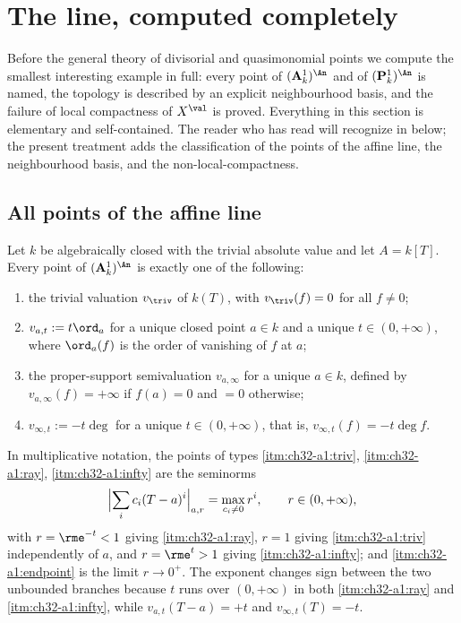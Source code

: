 \section{The line, computed completely}
\label{sec:ch32-line}

Before the general theory of divisorial and quasimonomial points we compute
the smallest interesting example in full: every point of
$(\mathbf A^1_k)^{\An}$ and of $(\mathbf P^1_k)^{\An}$ is named, the
topology is described by an explicit neighbourhood basis, and the failure of
local compactness of $X^{\val}$ is proved.  Everything in this section is
elementary and self-contained.  The reader who has read
 will recognize
 in  below; the
present treatment adds the classification of the points of the affine line,
the neighbourhood basis, and the non-local-compactness.

\subsection{All points of the affine line}
\label{sec:ch32-affine-line}

\begin{theorem}
\label{thm:ch32-a1-classification}
Let $k$ be algebraically closed with the trivial absolute value and let
$A=k[T]$.  Every point of $(\mathbf A^1_k)^{\An}$ is exactly one of the
following:
\begin{enumerate}
\item\label{itm:ch32-a1:triv}
the trivial valuation $v_{\triv}$ of $k(T)$, with
$v_\triv(f)=0$ for all $f\neq0$;
\item\label{itm:ch32-a1:ray}
$v_{a,t}:=t\ord_a$ for a unique closed point $a\in k$ and a unique
$t\in(0,+\infty)$, where $\ord_a(f)$ is the order of vanishing of $f$
at $a$;
\item\label{itm:ch32-a1:endpoint}
the proper-support semivaluation $v_{a,\infty}$ for a unique $a\in k$,
defined by $v_{a,\infty}(f)=+\infty$ if $f(a)=0$ and $=0$ otherwise;
\item\label{itm:ch32-a1:infty}
$v_{\infty,t}:=-t\deg$ for a unique $t\in(0,+\infty)$, that is,
$v_{\infty,t}(f)=-t\deg f$.
\end{enumerate}
In multiplicative notation, the points of types
\cref{itm:ch32-a1:triv}, \cref{itm:ch32-a1:ray}, \cref{itm:ch32-a1:infty} are
the seminorms
\[
 \Bigl|\sum_ic_i(T-a)^i\Bigr|_{a,r}=\max_{c_i\neq0}r^i,
 \qquad r\in(0,+\infty),
\]
with $r=\rme^{-t}<1$ giving \cref{itm:ch32-a1:ray}, $r=1$ giving
\cref{itm:ch32-a1:triv} independently of $a$, and $r=\rme^{t}>1$ giving
\cref{itm:ch32-a1:infty}; and \cref{itm:ch32-a1:endpoint} is the limit
$r\to0^+$.  The exponent changes sign between the two unbounded branches
because $t$ runs over $(0,+\infty)$ in both
\cref{itm:ch32-a1:ray} and \cref{itm:ch32-a1:infty}, while
$v_{a,t}(T-a)=+t$ and $v_{\infty,t}(T)=-t$.
\end{theorem}

